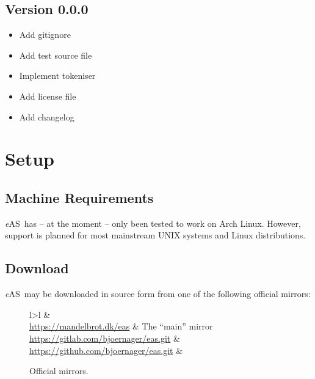 \documentclass[a4paper]{article}
\newcommand*{\eAS}{\textup{\textit{e}AS}}
\begin{document}
\begin{multicols*}{2}
			\subsection*{Version 0.0.0}
				\label{sec:project_changelog:version_0-0-0}
				\begin{itemize}
					\item Add gitignore
					\item Add test source file
					\item Implement tokeniser
					\item Add license file
					\item Add changelog
				\end{itemize}
		\end{multicols*}

	\clearpage
	\section{Setup}
		\label{sec:setup}
		\subsection{Machine Requirements}
			\label{sec:setup:machine_requirements}
			\eAS\ has -- at the moment -- only been tested to work on Arch Linux.
			However, support is planned for most mainstream UNIX systems and Linux distributions.

		\subsection{Download}
			\label{sec:setup:download}
			\eAS\ may be downloaded in source form from one of the following official mirrors:

			\begin{figure}[H]
				\centering

				\caption{Official mirrors.}
				\label{fig:mirrors}

				\begin{tabular}{l>{\itshape}l}
					\hline
					 &  \\
					\hline
					\url{https://mandelbrot.dk/eas}             & The ``main'' mirror \\
					\url{https://gitlab.com/bjoernager/eas.git} & {} \\
					\url{https://github.com/bjoernager/eas.git} & {} \\
					\hline
				\end{tabular}
			\end{figure}
\end{document}
